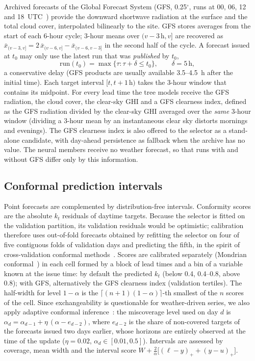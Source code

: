 Archived forecasts of the Global Forecast System (GFS, 0.25$^\circ$, runs at 00, 06, 12 and
18~UTC~\cite{ncep2015gfs}) provide the downward shortwave radiation at the surface and the total
cloud cover, interpolated bilinearly to the site. GFS stores averages from the start of each
6-hour cycle; 3-hour means over $(v - 3\,\mathrm{h}, v]$ are recovered as
$\bar x_{(v-3, v]} = 2\,\bar x_{(v-6, v]} - \bar x_{(v-6, v-3]}$ in the second half of the cycle.
A forecast issued at $t_0$ may only use the latest run that was \emph{published} by $t_0$,
\begin{equation}
  \mathrm{run}(t_0) = \max\{\tau : \tau + \delta \le t_0\}, \qquad \delta = 5\,\mathrm{h},
  \label{eq:run}
\end{equation}
a conservative delay (GFS products are usually available 3.5--4.5~h after the initial time).
Each target interval $[t, t + 1\,\mathrm{h})$ takes the 3-hour window that contains its
midpoint. For every lead time the tree models receive the GFS radiation, the cloud cover, the
clear-sky GHI and a GFS clearness index, defined as the GFS radiation divided by the clear-sky GHI
averaged over the \emph{same} 3-hour window (dividing a 3-hour mean by an instantaneous clear sky
distorts mornings and evenings). The GFS clearness index is also offered to the selector as a
stand-alone candidate, with day-ahead persistence as fallback when the archive has no value. The
neural members receive no weather forecast, so that runs with and without GFS differ only by
this information.

\subsection{Conformal prediction intervals}
\label{subsec:conformal}

Point forecasts are complemented by distribution-free intervals. Conformity scores are the
absolute $k_t$ residuals of daytime targets. Because the selector is fitted on the validation
partition, its validation residuals would be optimistic; calibration therefore uses out-of-fold
forecasts obtained by refitting the selector on four of five contiguous folds of validation days
and predicting the fifth, in the spirit of cross-validation conformal
methods~\cite{barber2021jackknife}. Scores are calibrated separately (Mondrian
conformal~\cite{vovk2005algorithmic}) in each cell formed by a block of lead times and a bin of a
variable known at the issue time: by default the predicted $k_t$ (below 0.4, 0.4--0.8, above
0.8); with GFS, alternatively the GFS clearness index (validation tertiles). The half-width for
level $1-\alpha$ is the $\lceil (n+1)(1-\alpha) \rceil$-th smallest of the $n$ scores of the
cell. Since exchangeability is questionable for weather-driven series, we also apply adaptive
conformal inference~\cite{gibbs2021adaptive}: the miscoverage level used on day $d$ is
$\alpha_d = \alpha_{d-1} + \eta\,(\alpha - e_{d-2})$, where $e_{d-2}$ is the share of
non-covered targets of the forecasts issued two days earlier, whose horizons are entirely observed
at the time of the update ($\eta = 0.02$, $\alpha_d \in [0.01, 0.5]$). Intervals are assessed by
coverage, mean width and the interval score
$W + \tfrac{2}{\alpha}\bigl[(\ell - y)_+ + (y - u)_+\bigr]$.

